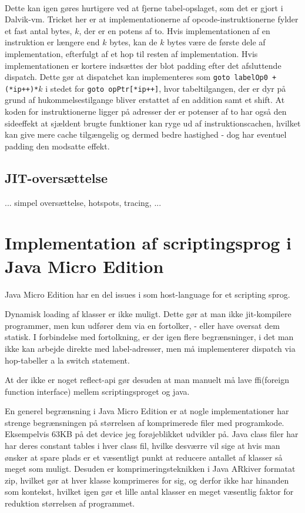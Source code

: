 \paragraph{}
Dette kan igen gøres hurtigere ved at fjerne tabel-opslaget, som det er gjort i Dalvik-vm. 
Tricket her er at implementationerne af opcode-instruktionerne fylder et fast antal bytes, $k$, der er en potens af to. Hvis implementationen af en instruktion er længere end $k$ bytes, kan de $k$ bytes være de første dele af implementation, efterfulgt af et hop til resten af implementation. Hvis implementationen er kortere indsættes der blot padding efter det afsluttende dispatch.
Dette gør at dispatchet kan implementeres som \verb|goto labelOp0 + (*ip++)*|$k$ i stedet for \verb|goto opPtr[*ip++]|, hvor tabeltilgangen, der er dyr på grund af hukommelsestilgange bliver erstattet af en addition samt et shift.
At koden for instruktionerne ligger på adresser der er potenser af to har også den sideeffekt at sjældent brugte funktioner kan ryge ud af instruktionscachen, hvilket kan give mere cache tilgængelig og dermed bedre hastighed - dog har eventuel padding den modsatte effekt.


\subsection{JIT-oversættelse}
... simpel oversættelse, hotspots, tracing, ...

\section{Implementation af scriptingsprog i Java Micro Edition}

Java Micro Edition har en del issues i som host-language for et scripting sprog.

Dynamisk loading af klasser er ikke muligt.  
Dette gør at man ikke jit-kompilere programmer, men kun udfører dem via en fortolker, - eller have oversat dem statisk. 
I forbindelse med fortolkning, er der igen flere begrænsninger, i det man ikke kan arbejde direkte med label-adresser, men må implementerer dispatch via hop-tabeller a la switch statement.

At der ikke er noget reflect-api gør desuden at man manuelt må lave ffi(foreign function interface) mellem scriptingsproget og java.

En generel begrænsning i Java Micro Edition er at nogle implementationer har strenge begrænsningen på størrelsen af komprimerede filer med programkode. Eksempelvis 63KB på det device jeg forøjeblikket udvikler på. 
Java class filer har har deres constant tables i hver class fil, hvilke desværre vil sige at hvis man ønsker at spare plads er et væsentligt punkt at reducere antallet af klasser så meget som muligt. Desuden er komprimeringsteknikken i Java ARkiver formatat zip, hvilket gør at hver klasse komprimeres for sig, og derfor ikke har hinanden som kontekst, hvilket igen gør et lille antal klasser en meget væsentlig faktor for reduktion størrelsen af programmet.

